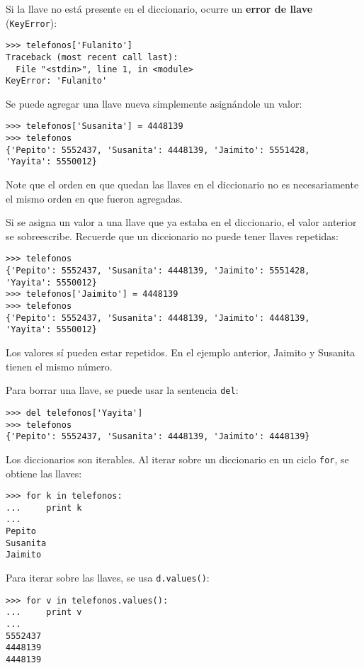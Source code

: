 Si la llave no está presente en el diccionario, ocurre un \textbf{error
de llave} (\lstinline!KeyError!):

\begin{lstlisting}
>>> telefonos['Fulanito']
Traceback (most recent call last):
  File "<stdin>", line 1, in <module>
KeyError: 'Fulanito'
\end{lstlisting}

Se puede agregar una llave nueva simplemente asignándole un valor:

\begin{lstlisting}
>>> telefonos['Susanita'] = 4448139
>>> telefonos
{'Pepito': 5552437, 'Susanita': 4448139, 'Jaimito': 5551428,
'Yayita': 5550012}
\end{lstlisting}

Note que el orden en que quedan las llaves en el diccionario no es
necesariamente el mismo orden en que fueron agregadas.

Si se asigna un valor a una llave que ya estaba en el diccionario, el
valor anterior se sobreescribe. Recuerde que un diccionario no puede
tener llaves repetidas:

\begin{lstlisting}
>>> telefonos
{'Pepito': 5552437, 'Susanita': 4448139, 'Jaimito': 5551428,
'Yayita': 5550012}
>>> telefonos['Jaimito'] = 4448139
>>> telefonos
{'Pepito': 5552437, 'Susanita': 4448139, 'Jaimito': 4448139,
'Yayita': 5550012}
\end{lstlisting}

Los valores sí pueden estar repetidos. En el ejemplo anterior, Jaimito y
Susanita tienen el mismo número.

Para borrar una llave, se puede usar la sentencia \lstinline!del!:

\begin{lstlisting}
>>> del telefonos['Yayita']
>>> telefonos
{'Pepito': 5552437, 'Susanita': 4448139, 'Jaimito': 4448139}
\end{lstlisting}

Los diccionarios son iterables. Al iterar sobre un diccionario en un
ciclo \lstinline!for!, se obtiene las llaves:

\begin{lstlisting}
>>> for k in telefonos:
...     print k
...
Pepito
Susanita
Jaimito
\end{lstlisting}

Para iterar sobre las llaves, se usa \lstinline!d.values()!:

\begin{lstlisting}
>>> for v in telefonos.values():
...     print v
...
5552437
4448139
4448139
\end{lstlisting}

